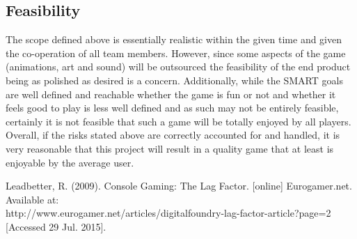 \documentclass[a4paper,10pt]{article}
\begin{document}
\subsection{Feasibility}
The scope defined above is essentially realistic within the given time and given the co-operation of all team members. However, since some aspects of the game (animations, art and sound) will be outsourced the feasibility of the end product being as polished as desired is a concern. Additionally, while the SMART goals are well defined and reachable whether the game is fun or not and whether it feels good to play is less well defined and as such may not be entirely feasible, certainly it is not feasible that such a game will be totally enjoyed by all players.
\newline
 Overall, if the risks stated above are correctly accounted for and handled, it is very reasonable that this project will result in a quality game that at least is enjoyable by the average user.
\newpage
\begin{thebibliography}{9} 
	 Leadbetter, R. (2009). Console Gaming: The Lag Factor. [online] Eurogamer.net. Available at: \\http://www.eurogamer.net/articles/digitalfoundry-lag-factor-article?page=2 [Accessed 29 Jul. 2015]. 
\end{thebibliography}
\end{document}
